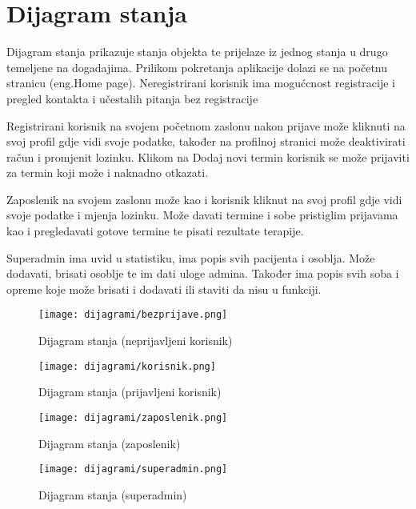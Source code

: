 \eject

\section{Dijagram stanja}

Dijagram stanja prikazuje stanja objekta te prijelaze iz jednog stanja u drugo temeljene na dogadajima. Prilikom pokretanja aplikacije dolazi se na početnu stranicu (eng.Home page). Neregistrirani korisnik ima mogućcnost registracije i pregled kontakta i učestalih pitanja bez registracije

Registrirani korisnik na svojem početnom zaslonu nakon prijave može kliknuti na svoj profil gdje vidi svoje podatke, također na profilnoj stranici može deaktivirati račun i promjenit lozinku. Klikom na Dodaj novi termin korisnik se može prijaviti za termin koji može i naknadno otkazati.

Zaposlenik na svojem zaslonu može kao i korisnik kliknut na svoj profil gdje vidi svoje podatke i mjenja lozinku. Može davati termine i sobe pristiglim prijavama kao i pregledavati gotove termine te pisati rezultate terapije.

Superadmin ima uvid u statistiku, ima popis svih pacijenta i osoblja. Može dodavati, brisati osoblje te im dati uloge admina. Također ima popis svih soba i opreme koje može brisati i dodavati ili staviti da nisu u funkciji.

\begin{figure}[H]
	\texttt{[image: dijagrami/bezprijave.png]}
	\centering
	\caption{Dijagram stanja (neprijavljeni korisnik)}
	\label{fig:bezprijave}
\end{figure}

\begin{figure}[H]
	\texttt{[image: dijagrami/korisnik.png]}
	\centering
	\caption{Dijagram stanja (prijavljeni korisnik)}
	\label{fig:korisnik}
\end{figure}

\begin{figure}[H]
	\texttt{[image: dijagrami/zaposlenik.png]}
	\centering
	\caption{Dijagram stanja (zaposlenik)}
	\label{fig:zaposlenik}
\end{figure}

\begin{figure}[H]
	\texttt{[image: dijagrami/superadmin.png]}
	\centering
	\caption{Dijagram stanja (superadmin)}
	\label{fig:superadmin}
\end{figure}

